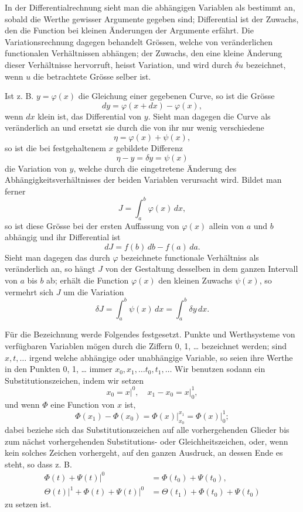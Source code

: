 \documentclass[11pt,a4paper,leqno]{article}
\begin{document}
In der Differentialrechnung sieht man die abhängigen Variablen als bestimmt an, sobald die Werthe gewisser Argumente gegeben sind; Differential ist der Zuwachs, den die Function bei kleinen Änderungen der Argumente erfährt. Die Variationsrechnung dagegen behandelt Grössen, welche von veränderlichen functionalen Verhältnissen abhängen; der Zuwachs, den eine kleine Änderung dieser Verhältnisse hervorruft, heisst Variation, und wird durch $\delta u$ bezeichnet, wenn $u$ die betrachtete Grösse selber ist.

Ist z. B. $y=\varphi(x)$ die Gleichung einer gegebenen Curve, so ist die Grösse
\[
 dy=\varphi(x+dx)-\varphi(x),
\]
wenn $dx$ klein ist, das Differential von $y$. Sieht man dagegen die Curve als veränderlich an und ersetzt sie durch die von ihr nur wenig verschiedene
\[
 \eta=\varphi(x)+\psi(x),
\]
so ist die bei festgehaltenem $x$ gebildete Differenz
\[
 \eta-y=\delta y=\psi(x)
\]
die Variation von $y$, welche durch die eingetretene Änderung des Abhängigkeitsverhältnisses der beiden Variablen verursacht wird. Bildet man ferner
\[
 J=\int_a^b \varphi(x)\,dx,
\]
so ist diese Grösse bei der ersten Auffassung von $\varphi(x)$ allein von $a$ und $b$ abhängig und ihr Differential ist
\[
 dJ=f(b)\,db-f(a)\,da.
\]
Sieht man dagegen das durch $\varphi$ bezeichnete functionale Verhältniss als veränderlich an, so hängt $J$ von der Gestaltung desselben in dem ganzen Intervall von $a$ bis $b$ ab; erhält die Function $\varphi(x)$ den kleinen Zuwachs $\psi(x)$, so vermehrt sich $J$ um die Variation
\[
 \delta J=\int_a^b \psi(x)\,dx=\int_a^b \delta y\,dx.
\]

Für die Bezeichnung werde Folgendes festgesetzt. Punkte und Werthsysteme von verfügbaren Variablen mögen durch die Ziffern 0, 1, \ldots{} bezeichnet werden; sind $x,t,\ldots$ irgend welche abhängige oder unabhängige Variable, so seien ihre Werthe in den Punkten 0, 1, \ldots{} immer $x_0,x_1,\ldots t_0,t_1,\ldots$ Wir benutzen sodann ein Substitutionszeichen, indem wir setzen
\[
 x_0=\left.x\right|^{0},\quad x_1-x_0=\left.x\right|_{0}^{1},
\]
und wenn $\Phi$ eine Function von $x$ ist,
\[
 \Phi(x_1)-\Phi(x_0)=\left.\Phi(x)\right|_{x_0}^{x_1}=\left.\Phi(x)\right|_{0}^{1};
\]
dabei beziehe sich das Substitutionszeichen auf alle vorhergehenden Glieder bis zum nächst vorhergehenden Substitutions- oder Gleichheitszeichen, oder, wenn kein solches Zeichen vorhergeht, auf den ganzen Ausdruck, an dessen Ende es steht, so dass z. B.
\[
\begin{aligned}
 \left.\Phi(t)+\Psi(t)\right|^0&=\Phi(t_0)+\Psi(t_0),\\
 \left.\Theta(t)\right|^1+\left.\Phi(t)+\Psi(t)\right|^0&=\Theta(t_1)+\Phi(t_0)+\Psi(t_0)
\end{aligned}
\]
zu setzen ist.
\end{document}
